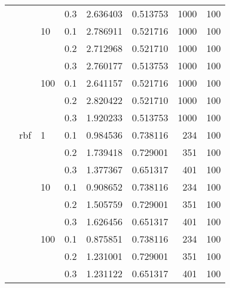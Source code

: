 \begin{table}[H]
\begin{tabular}{llllrrrr}
     &     &     & 0.3 &  2.636403 &  0.513753 &    1000 &   100 \\
     &     & 10  & 0.1 &  2.786911 &  0.521716 &    1000 &   100 \\
     &     &     & 0.2 &  2.712968 &  0.521710 &    1000 &   100 \\
     &     &     & 0.3 &  2.760177 &  0.513753 &    1000 &   100 \\
     &     & 100 & 0.1 &  2.641157 &  0.521716 &    1000 &   100 \\
     &     &     & 0.2 &  2.820422 &  0.521710 &    1000 &   100 \\
     &     &     & 0.3 &  1.920233 &  0.513753 &    1000 &   100 \\
     & rbf & 1   & 0.1 &  0.984536 &  0.738116 &     234 &   100 \\
     &     &     & 0.2 &  1.739418 &  0.729001 &     351 &   100 \\
     &     &     & 0.3 &  1.377367 &  0.651317 &     401 &   100 \\
     &     & 10  & 0.1 &  0.908652 &  0.738116 &     234 &   100 \\
     &     &     & 0.2 &  1.505759 &  0.729001 &     351 &   100 \\
     &     &     & 0.3 &  1.626456 &  0.651317 &     401 &   100 \\
     &     & 100 & 0.1 &  0.875851 &  0.738116 &     234 &   100 \\
     &     &     & 0.2 &  1.231001 &  0.729001 &     351 &   100 \\
     &     &     & 0.3 &  1.231122 &  0.651317 &     401 &   100 \\
\bottomrule
\end{tabular}
\end{table}
